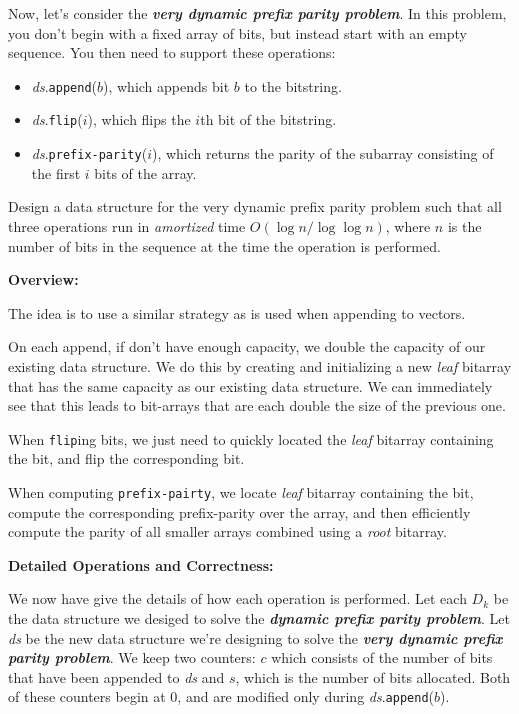 \documentclass[12pt]{exam}
\newcommand{\bi}[1]{\textit{\textbf{#1}}}
\begin{document}
\begin{questions}
Now, let's consider the \bi{very dynamic prefix parity problem}. In this problem, you don't begin with a fixed array of bits, but instead start with an empty sequence. You then need to support these operations:
\begin{itemize}
    \item \textit{ds}.\texttt{append}($b$), which appends bit $b$ to the bitstring. 
    \item \textit{ds}.\texttt{flip}($i$), which flips the $i$th bit of the bitstring.
    \item \textit{ds}.\texttt{prefix-parity}($i$), which returns the parity of the subarray consisting of the first $i$ bits of the array.
\end{itemize}
Design a data structure for the very dynamic prefix parity problem such that all three operations run in \textit{amortized} time $O(\log n / \log \log n)$, where $n$ is the number of bits in the sequence at the time the operation is performed. 

\begin{solution}
\textbf{Overview:}

The idea is to use a similar strategy as is used when appending to vectors.

On each append, if don't have enough capacity, we double the capacity of our existing data structure. We do this by creating and initializing a new \textit{leaf} bitarray that has the same capacity as our existing data structure. We can immediately see that this leads to bit-arrays that are each double the size of the previous one.

When \texttt{flip}ing bits, we just need to quickly located the \textit{leaf} bitarray containing the bit, and flip the corresponding bit.

When computing \texttt{prefix-pairty}, we locate \textit{leaf} bitarray containing the bit, compute the corresponding prefix-parity over the array, and then efficiently compute the parity of all smaller arrays combined using a \textit{root} bitarray.

\textbf{Detailed Operations and Correctness: }

We now have give the details of how each operation is performed. Let each $D_k$ be the data structure we desiged to solve the \bi{dynamic prefix parity problem}. Let \textit{ds} be the new data structure we're designing to solve the \bi{very dynamic prefix parity problem}. We keep two counters: $c$ which consists of the number of bits that have been appended to \textit{ds} and $s$, which is the number of bits allocated. Both of these counters begin at $0$, and are modified only during \textit{ds}.\texttt{append}($b$).


\end{solution}
\end{questions}
\end{document}
